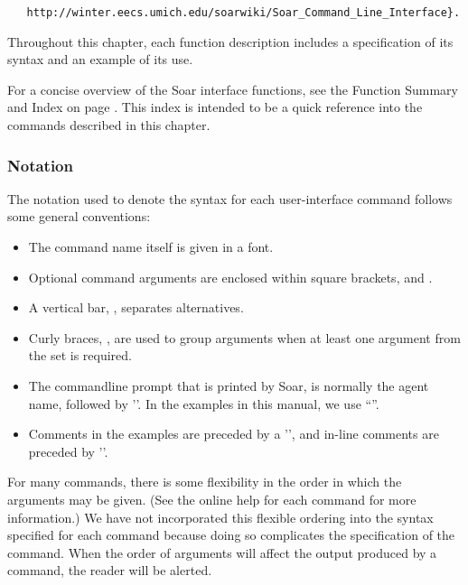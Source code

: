 \begin{verbatim}
   http://winter.eecs.umich.edu/soarwiki/Soar_Command_Line_Interface}.
\end{verbatim}

Throughout this chapter, each function description includes a specification of
its syntax and an example of its use. 

For a concise overview of the Soar interface functions, see the Function
Summary and Index on page \pageref{func-sum}. This index is intended to be a
quick reference into the commands described in this chapter.

\subsubsection*{Notation}


The notation used to denote the syntax for each user-interface command follows
some general conventions:\vspace{-12pt}
\begin{itemize}
\item The command name itself is given in a  font.\vspace{-8pt}
\item Optional command arguments are enclosed within square brackets,
	\soar{[} and \soar{]}.\vspace{-8pt}
\item A vertical bar, \soar{|}, separates alternatives.\vspace{-8pt}
\item Curly braces, \soar{\{\}}, are used to group arguments when at least
one argument from the set is required.
\item The commandline prompt that is printed by Soar, is normally
the agent name, followed by '\soar{>}'.  In the examples in this manual, 
we use ``''.
\item Comments in the examples are preceded by
a '\soar{\#}', and in-line comments are preceded by '\soar{;\#}'.
\end{itemize}

For many commands, there is some flexibility in the order in which the
arguments may be given. (See the online help for each command for more
information.)  We have not incorporated this flexible ordering into the syntax
specified for each command because doing so complicates the specification of
the command.  When the order of arguments will affect the output
produced by a command, the reader will be alerted.

